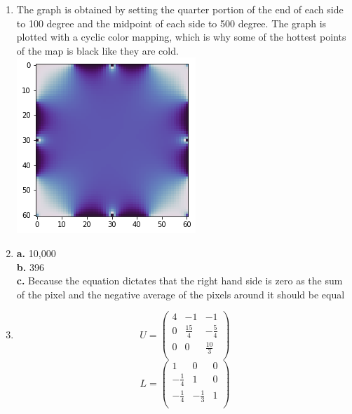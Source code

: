 \documentclass[11pt]{article}
\begin{document}
\newpage
\begin{enumerate}

\item 
The graph is obtained by setting the quarter portion of the end of each side to 100 degree and the midpoint of each side to 500 degree. The graph is plotted with a cyclic color mapping, which is why some of the hottest points of the map is black like they are cold. \newline
\includegraphics{index}

\item 
{\bf a.} 10,000\\
{\bf b.} 396\\
{\bf c.} Because the equation dictates that the right hand side is zero as the sum of the pixel and the negative average of the pixels around it should be equal

\item
$$U =
\left(
\begin{array}{ccc}
4 & -1 & -1 \\ 	
0 & \frac{15}{4} & -\frac{5}{4} \\ 
0 & 0 &  \frac{10}{3} \\
\end{array} \right)
$$
$$L =
\left(
\begin{array}{ccc}
1 & 0 & 0 \\ 	
-\frac{1}{4} & 1 & 0 \\ 
-\frac{1}{4} & -\frac{1}{3} & 1 \\
\end{array} \right)
$$


\end{enumerate}
\end{document}
